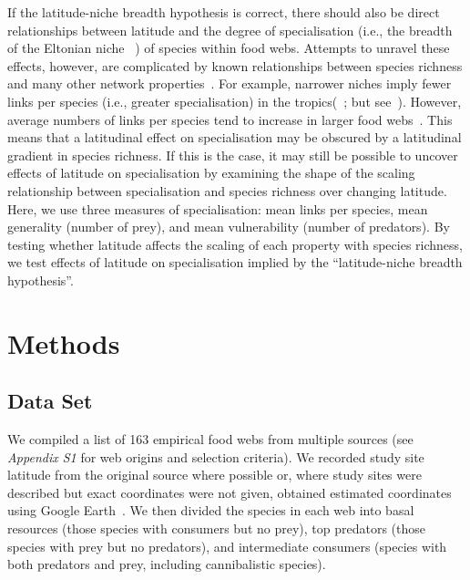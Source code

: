 \documentclass[12pt]{article}
\begin{document}
  If the latitude-niche breadth hypothesis is correct, there should also be direct relationships between latitude and the
  degree of specialisation (i.e., the breadth of the Eltonian niche ~\citep{Elton1927}) of species within food webs.
  Attempts to unravel these effects, however,
  are complicated by known relationships between species richness and many other network properties~\citep{Riede2010}. 
  For example,
  narrower niches imply fewer links per species (i.e., greater specialisation) in the tropics(~\citealp{Dyer2007,Marra1997};
  but see~\citealp{Schleuning2012}). However,
  average numbers of links per species tend to increase in larger food webs~\citep{Dunne2006,Riede2010}. This means
  that a latitudinal effect on specialisation may be obscured by a latitudinal gradient in species richness. If this is
  the case, it may still be possible to uncover effects of latitude on specialisation by examining the shape of the scaling 
  relationship between specialisation and species richness over changing latitude. Here, we use three measures of specialisation:
  mean links per species, mean generality (number of prey), and mean vulnerability (number of predators). By testing whether
  latitude affects the scaling of each property with species richness, we test effects of latitude on specialisation implied by
  the ``latitude-niche breadth hypothesis''.


\section*{Methods}

  \subsection*{Data Set} 

    We compiled a list of 163 empirical food webs from
    multiple sources (see \emph{Appendix S1} for web origins and selection
    criteria). We recorded study site latitude from the original source where
    possible or, where study sites were described but exact coordinates were not
    given, obtained estimated coordinates using Google Earth~\citep{GoogleEarth}.
    We then divided the species in each web into basal resources (those species with
    consumers but no prey), top predators (those species with prey but no predators),
    and intermediate consumers (species with both predators and prey, including cannibalistic
    species). 
\end{document}
